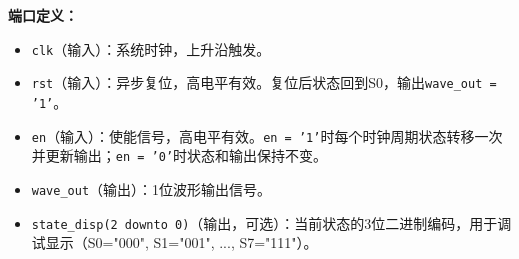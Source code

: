 \textbf{端口定义：}
\begin{itemize}
  \item \texttt{clk}（输入）：系统时钟，上升沿触发。
  \item \texttt{rst}（输入）：异步复位，高电平有效。复位后状态回到S0，输出\texttt{wave\_out = '1'}。
  \item \texttt{en}（输入）：使能信号，高电平有效。\texttt{en = '1'}时每个时钟周期状态转移一次并更新输出；\texttt{en = '0'}时状态和输出保持不变。
  \item \texttt{wave\_out}（输出）：1位波形输出信号。
  \item \texttt{state\_disp(2~downto~0)}（输出，可选）：当前状态的3位二进制编码，用于调试显示（S0="000", S1="001", ..., S7="111"）。
\end{itemize}

\vspace{0.3cm}

